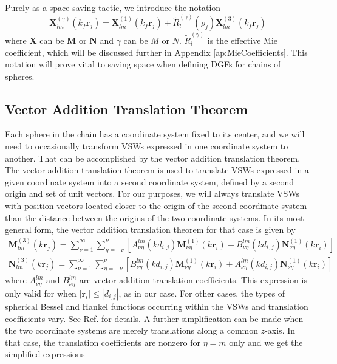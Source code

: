 Purely as a space-saving tactic, we introduce the notation
%
\begin{equation}
\boldsymbol{X}_{lm}^{(\gamma)}(k_{f} \boldsymbol{r}_{j}) = \boldsymbol{X}_{lm}^{(1)}(k_{f} \boldsymbol{r}_{j}) + \widetilde{R}_{l}^{(\gamma)}(\rho_{j}) \boldsymbol{X}_{lm}^{(3)}(k_{f} \boldsymbol{r}_{j})
\end{equation}
%
where $\boldsymbol{X}$ can be $\boldsymbol{M}$ or $\boldsymbol{N}$ and $\gamma$ can be $M$ or $N$. $\widetilde{R}_{l}^{(\gamma)}$ is the effective Mie coefficient, which will be discussed further in Appendix \ref{ap:MieCoefficients}. This notation will prove vital to saving space when defining DGFs for chains of spheres.


\subsection{Vector Addition Translation Theorem}
%
Each sphere in the chain has a coordinate system fixed to its center, and we will need to occasionally transform VSWs expressed in one coordinate system to another. That can be accomplished by the vector addition translation theorem.\cite{Cruzan1962, Borghese1980, Felderhof1987, Chew1992, Chew1995, Kim2004a, Dufva2008} The vector addition translation theorem is used to translate VSWs expressed in a given coordinate system into a second coordinate system, defined by a second origin and set of unit vectors. For our purposes, we will always translate VSWs with position vectors located closer to the origin of the second coordinate system than the distance between the origins of the two coordinate systems. In its most general form, the vector addition translation theorem for that case is given by 
%
\begin{subequations}
\begin{align}
\boldsymbol{M}_{lm}^{(3)}(k \boldsymbol{r}_{j}) = \sum_{\nu = 1}^{\infty} \sum_{\eta = -\nu}^{\nu} \left[ A_{\nu \eta}^{lm}(k d_{i,j}) \boldsymbol{M}_{\nu \eta}^{(1)}(k \boldsymbol{r}_{i}) + B_{\nu \eta}^{lm}(k d_{i,j}) \boldsymbol{N}_{\nu \eta}^{(1)}(k \boldsymbol{r}_{i}) \right]
\\
\boldsymbol{N}_{lm}^{(3)}(k \boldsymbol{r}_{j}) = \sum_{\nu = 1}^{\infty} \sum_{\eta = -\nu}^{\nu} \left[ B_{\nu \eta}^{lm}(k d_{i,j}) \boldsymbol{M}_{\nu \eta}^{(1)}(k \boldsymbol{r}_{i}) + A_{\nu \eta}^{lm}(k d_{i,j}) \boldsymbol{N}_{\nu \eta}^{(1)}(k \boldsymbol{r}_{i}) \right]
\end{align}
\end{subequations}
where $A_{\nu \eta}^{lm}$ and $B_{\nu \eta}^{lm}$ are vector addition translation coefficients. This expression is only valid for when $|\boldsymbol{r}_{i}| \le |d_{i,j}|$, as in our case. For other cases, the types of spherical Bessel and Hankel functions occurring within the VSWs and translation coefficients vary. See Ref.  for details. A further simplification can be made when the two coordinate systems are merely translations along a common $z$-axis. In that case, the translation coefficients are nonzero for $\eta=m$ only and we get the simplified expressions
